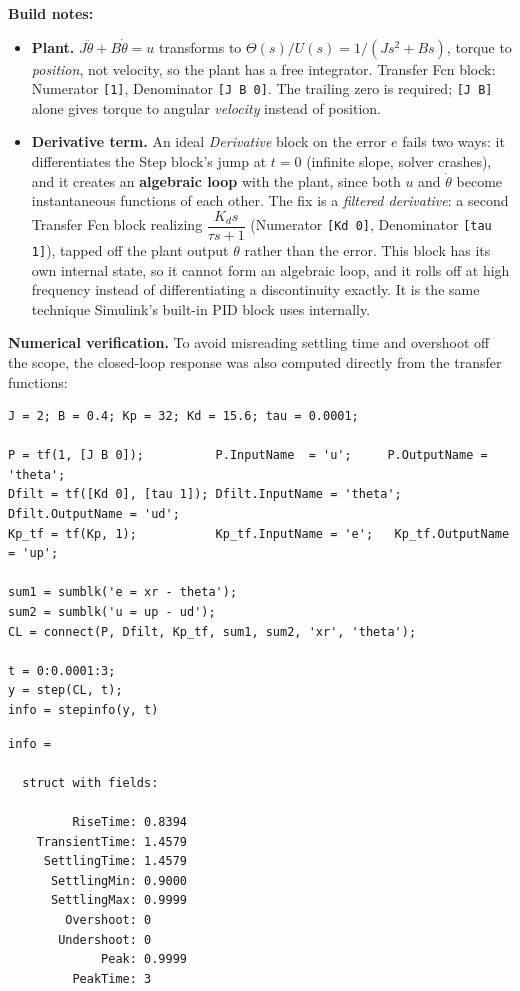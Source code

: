 \documentclass[12pt]{article}
\begin{document}
\textbf{Build notes:}
\begin{itemize}
    \item \textbf{Plant.} $J\ddot\theta+B\dot\theta=u$ transforms to
          $\Theta(s)/U(s) = 1/(Js^2+Bs)$, torque to \emph{position}, not velocity, so the plant
          has a free integrator. Transfer Fcn block: Numerator \texttt{[1]}, Denominator
          \texttt{[J B 0]}. The trailing zero is required; \texttt{[J B]} alone gives torque to
          angular \emph{velocity} instead of position.
    \item \textbf{Derivative term.} An ideal \textit{Derivative} block on the error $e$ fails two
          ways: it differentiates the Step block's jump at $t=0$ (infinite slope, solver crashes),
          and it creates an \textbf{algebraic loop} with the plant, since both $u$ and $\dot\theta$
          become instantaneous functions of each other. The fix is a \textit{filtered derivative}: a
          second Transfer Fcn block realizing $\dfrac{K_d s}{\tau s+1}$ (Numerator \texttt{[Kd 0]},
          Denominator \texttt{[tau 1]}), tapped off the plant output $\theta$ rather than the error.
          This block has its own internal state, so it cannot form an algebraic loop, and it rolls
          off at high frequency instead of differentiating a discontinuity exactly. It is the same
          technique Simulink's built-in PID block uses internally.
\end{itemize}

\textbf{Numerical verification.} To avoid misreading settling time and overshoot off the scope, the
closed-loop response was also computed directly from the transfer functions:

\begin{lstlisting}
J = 2; B = 0.4; Kp = 32; Kd = 15.6; tau = 0.0001;

P = tf(1, [J B 0]);          P.InputName  = 'u';     P.OutputName = 'theta';
Dfilt = tf([Kd 0], [tau 1]); Dfilt.InputName = 'theta'; Dfilt.OutputName = 'ud';
Kp_tf = tf(Kp, 1);           Kp_tf.InputName = 'e';   Kp_tf.OutputName = 'up';

sum1 = sumblk('e = xr - theta');
sum2 = sumblk('u = up - ud');
CL = connect(P, Dfilt, Kp_tf, sum1, sum2, 'xr', 'theta');

t = 0:0.0001:3;
y = step(CL, t);
info = stepinfo(y, t)
\end{lstlisting}

\begin{lstlisting}[style=output]
info =

  struct with fields:

         RiseTime: 0.8394
    TransientTime: 1.4579
     SettlingTime: 1.4579
      SettlingMin: 0.9000
      SettlingMax: 0.9999
        Overshoot: 0
       Undershoot: 0
             Peak: 0.9999
         PeakTime: 3
\end{lstlisting}
\end{document}
